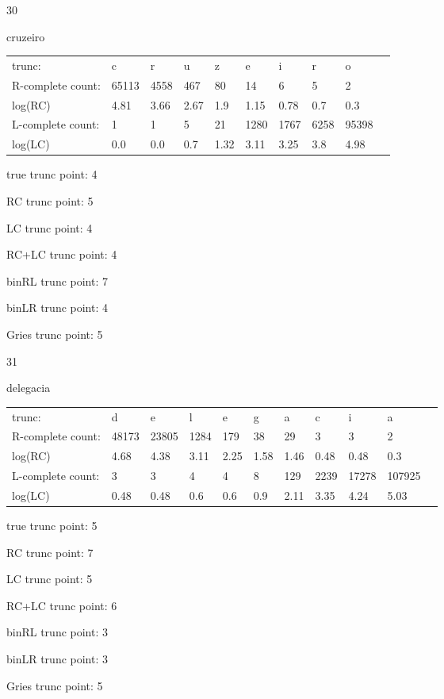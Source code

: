 \documentclass[10pt]{article}
\begin{document}
30

cruzeiro

\begin{tabular}{l|lllllllll}
trunc: & c & r & u & z & e & i & r & o & \\ 
R-complete count: & 65113 & 4558 & 467 & 80 & 14 & 6 & 5 & 2 & \\ 
log(RC) & 4.81 & 3.66 & 2.67 & 1.9 & 1.15 & 0.78 & 0.7 & 0.3 & \\ 
L-complete count: & 1 & 1 & 5 & 21 & 1280 & 1767 & 6258 & 95398 & \\ 
log(LC) & 0.0 & 0.0 & 0.7 & 1.32 & 3.11 & 3.25 & 3.8 & 4.98 & \\ 
\end{tabular}

true trunc point: 4

RC trunc point: 5

LC trunc point: 4

RC+LC trunc point: 4

binRL trunc point: 7

binLR trunc point: 4

Gries trunc point: 5

\vspace{1em}

31

delegacia

\begin{tabular}{l|llllllllll}
trunc: & d & e & l & e & g & a & c & i & a & \\ 
R-complete count: & 48173 & 23805 & 1284 & 179 & 38 & 29 & 3 & 3 & 2 & \\ 
log(RC) & 4.68 & 4.38 & 3.11 & 2.25 & 1.58 & 1.46 & 0.48 & 0.48 & 0.3 & \\ 
L-complete count: & 3 & 3 & 4 & 4 & 8 & 129 & 2239 & 17278 & 107925 & \\ 
log(LC) & 0.48 & 0.48 & 0.6 & 0.6 & 0.9 & 2.11 & 3.35 & 4.24 & 5.03 & \\ 
\end{tabular}

true trunc point: 5

RC trunc point: 7

LC trunc point: 5

RC+LC trunc point: 6

binRL trunc point: 3

binLR trunc point: 3

Gries trunc point: 5

\vspace{1em}
\end{document}
